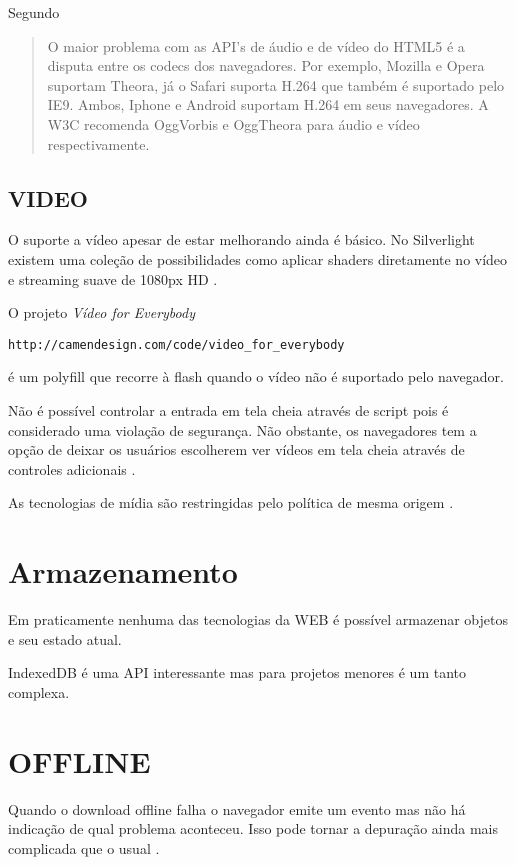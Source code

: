\begin{draft}
Segundo \cite{html5Tradeoffs}
\begin{quote}
O maior problema com as API's de áudio e de vídeo do HTML5 é
a disputa entre os codecs dos navegadores. Por exemplo, Mozilla e
Opera suportam Theora, já o Safari suporta H.264 que também é
suportado pelo IE9. Ambos, Iphone e Android suportam H.264 em seus
navegadores. A W3C recomenda OggVorbis e OggTheora para áudio e vídeo
respectivamente.
\end{quote}

\subsection{VIDEO}

O suporte a vídeo apesar de estar melhorando ainda é básico. No
Silverlight existem uma coleção de possibilidades como aplicar shaders
diretamente no vídeo e streaming suave de 1080px HD \autocite[pp.
8]{researchOnHtml}.

O projeto \textit{Vídeo for Everybody} \begin{verbatim}
http://camendesign.com/code/video_for_everybody \end{verbatim} é um
polyfill que recorre à flash quando o vídeo não é suportado pelo
navegador.

Não é possível controlar a entrada em tela cheia através de script pois 
é considerado uma violação de segurança. Não obstante, os navegadores
tem a opção de deixar os usuários escolherem ver vídeos em tela cheia
através de  controles adicionais \autocite[pp. 68]{proHtml5}.

As tecnologias de mídia são restringidas pelo política de mesma origem \autocite[pp. 68]{proHtml5}.

\section{Armazenamento}

Em praticamente nenhuma das tecnologias da WEB é possível armazenar objetos e  seu estado atual.

IndexedDB é uma API interessante mas para projetos menores é um tanto complexa.

\section{OFFLINE}

Quando o download offline falha o navegador emite um evento mas não há
indicação de qual problema aconteceu. Isso pode tornar a depuração
ainda mais complicada que o usual \autocite{diveIntohtml}.


\end{draft}
